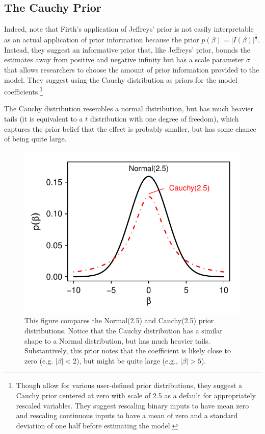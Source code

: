 \documentclass[12pt]{article}
\begin{document}
\subsection*{The Cauchy Prior}

Indeed, \cite{Gelmanetal2008} note that Firth's application of Jeffreys' prior is not easily interpretable as an actual application of prior information because the prior $p(\beta) = |I(\beta)|^\frac{1}{2}$. Instead, they suggest an informative prior that, like Jeffreys' prior, bounds the estimates away from positive and negative infinity but has a scale parameter $\sigma$ that allows researchers to choose the amount of prior information provided to the model. They suggest using the Cauchy distribution as priors for the model coefficients.\footnote{Though \cite{Gelmanetal2008} allow for various user-defined prior distributions, they suggest a Cauchy prior centered at zero with scale of 2.5 as a default for appropriately rescaled variables. They suggest rescaling binary inputs to have mean zero and rescaling continuous inputs to have a mean of zero and a standard deviation of one half before estimating the model.}

The Cauchy distribution resembles a normal distribution, but has much heavier tails (it is equivalent to a $t$ distribution with one degree of freedom), which captures the prior belief that the effect is probably smaller, but has some chance of being quite large.

\begin{figure}[H]
\begin{center}
\includegraphics[scale = .8]{figs/illustrate-prior-density.pdf}
\caption{This figure compares the Normal(2.5) and Cauchy(2.5) prior distributions. Notice that the Cauchy distribution has a similar shape to a Normal distribution, but has much heavier tails. Substantively, this prior notes that the coefficient is likely close to zero (e.g. $|\beta| < 2$), but might be quite large (e.g., $|\beta| > 5$).}\label{fig:illustrate-prior-density}
\end{center}
\end{figure}
\end{document}
